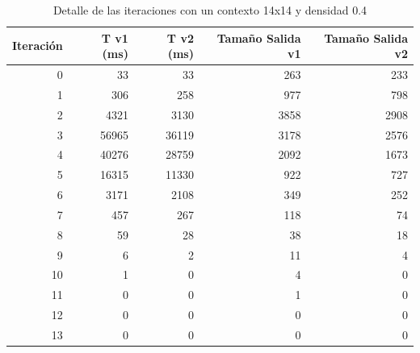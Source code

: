 	\begin{table}[htbp]
		\caption{Detalle de las iteraciones con un contexto 14x14 y densidad 0.4}
		\begin{center}
			\begin{tabular}{|r|r|r|r|r|}
				\hline
				Iteración  & T v1 (ms) & T v2 (ms) & Tamaño Salida v1  & Tamaño Salida v2  \\ \hline \hline
				0 & 33 & 33 & 263 & 233 \\ \hline
				1 & 306 & 258 & 977 & 798 \\ \hline
				2 & 4321 & 3130 & 3858 & 2908 \\ \hline
				3 & 56965 & 36119 & 3178 & 2576 \\ \hline
				4 & 40276 & 28759 & 2092 & 1673 \\ \hline
				5 & 16315 & 11330 & 922 & 727 \\ \hline
				6 & 3171 & 2108 & 349 & 252 \\ \hline
				7 & 457 & 267 & 118 & 74 \\ \hline
				8 & 59 & 28 & 38 & 18 \\ \hline
				9 & 6 & 2 & 11 & 4 \\ \hline
				10 & 1 & 0 & 4 & 0 \\ \hline
				11 & 0 & 0 & 1 & 0 \\ \hline
				12 & 0 & 0 & 0 & 0 \\ \hline
				13 & 0 & 0 & 0 & 0 \\ \hline
			\end{tabular}
		\end{center}
		\label{iteraciones14d4}
	\end{table}
	
